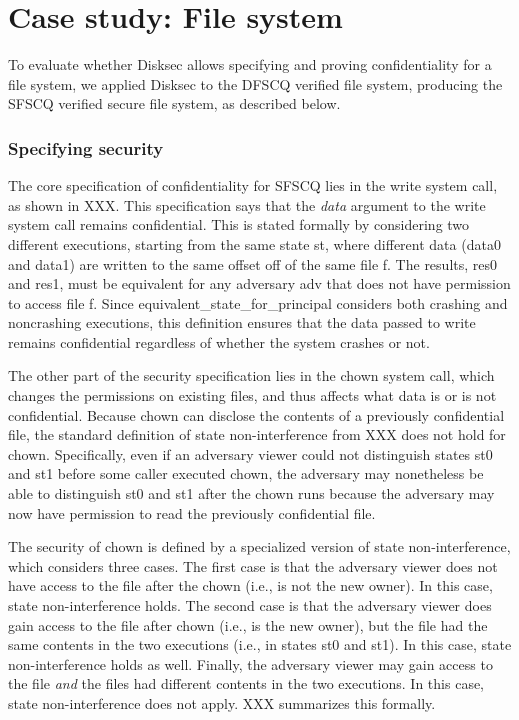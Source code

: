 \chapter{Case study: File system}
\label{s:fs}

To evaluate whether Disksec allows specifying and proving confidentiality
for a file system, we applied Disksec to the DFSCQ verified file system,
producing the SFSCQ verified secure file system, as described below.


\subsection{Specifying security}

The core specification of confidentiality for SFSCQ lies in the
write system call, as shown in XXX.  This
specification says that the \emph{data} argument to the {write}
system call remains confidential.  This is stated formally by
considering two different executions, starting from the same
state {st}, where different data ({data0} and {data1})
are written to the same offset {off} of the same file {f}.
The results, {res0} and {res1}, must be equivalent for any
adversary {adv} that does not have permission to access file {f}.
Since {equivalent\_state\_for\_principal} considers both crashing and
noncrashing executions, this definition ensures that the data passed to
{write} remains confidential regardless of whether the system crashes
or not.

%  

The other part of the security specification lies in the {chown}
system call, which changes the permissions on existing files, and thus
affects what data is or is not confidential.  Because {chown} can
disclose the contents of a previously confidential file, the standard
definition of state non-interference from XXX
does not hold for {chown}.  Specifically, even if an adversary
{viewer} could not distinguish states {st0} and {st1} before some
{caller} executed {chown}, the adversary may nonetheless be able
to distinguish {st0} and {st1} after the {chown} runs because
the adversary may now have permission to read the previously confidential
file.

The security of {chown} is defined by a specialized version of
state non-interference, which considers three cases.  The first case
is that the adversary {viewer} does not have access to the file
after the {chown} (i.e., is not the new owner).
In this case, state non-interference holds.
The second case is that the adversary {viewer} does gain access to
the file after {chown} (i.e., is the new owner),
but the file had the same contents in the
two executions (i.e., in states {st0} and {st1}).  In this case,
state non-interference holds as well.  Finally, the adversary {viewer}
may gain access to the file \emph{and} the files had different contents in
the two executions.  In this case, state non-interference does not apply.
XXX summarizes this formally.

